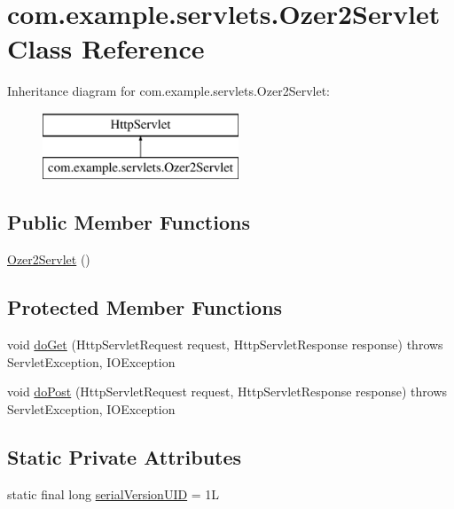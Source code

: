\hypertarget{classcom_1_1example_1_1servlets_1_1_ozer2_servlet}{}\section{com.\+example.\+servlets.\+Ozer2\+Servlet Class Reference}
\label{classcom_1_1example_1_1servlets_1_1_ozer2_servlet}
Inheritance diagram for com.\+example.\+servlets.\+Ozer2\+Servlet\+:\begin{figure}[H]
\begin{center}
\leavevmode
\includegraphics[height=2.000000cm]{classcom_1_1example_1_1servlets_1_1_ozer2_servlet}
\end{center}
\end{figure}
\subsection*{Public Member Functions}
\begin{DoxyCompactItemize}
\item 
\hyperlink{classcom_1_1example_1_1servlets_1_1_ozer2_servlet_a06251df51ea525cfedf5dec488ad58f2}{Ozer2\+Servlet} ()
\end{DoxyCompactItemize}
\subsection*{Protected Member Functions}
\begin{DoxyCompactItemize}
\item 
void \hyperlink{classcom_1_1example_1_1servlets_1_1_ozer2_servlet_af9ddf218ed38e3372658be9ebfbdde64}{do\+Get} (Http\+Servlet\+Request request, Http\+Servlet\+Response response)  throws Servlet\+Exception, I\+O\+Exception 
\item 
void \hyperlink{classcom_1_1example_1_1servlets_1_1_ozer2_servlet_a3dc6ef2c0365fad91e8ebb6b9106551a}{do\+Post} (Http\+Servlet\+Request request, Http\+Servlet\+Response response)  throws Servlet\+Exception, I\+O\+Exception 
\end{DoxyCompactItemize}
\subsection*{Static Private Attributes}
\begin{DoxyCompactItemize}
\item 
static final long \hyperlink{classcom_1_1example_1_1servlets_1_1_ozer2_servlet_adda557e8b6e5941a32e2aa6a66ad1295}{serial\+Version\+U\+I\+D} = 1\+L
\end{DoxyCompactItemize}


